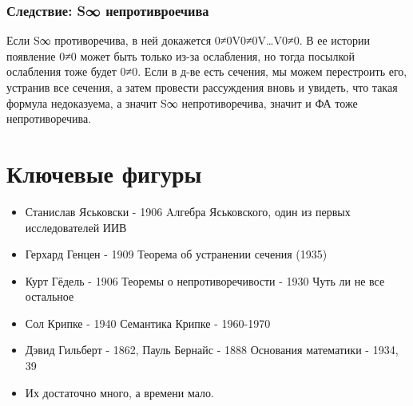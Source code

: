 \documentclass[11pt]{article}
\begin{document}
\subsubsection{Следствие: S∞ непротивроечива}
\label{sec-18-4-4}
Если S∞ противоречива, в ней докажется 0≠0V0≠0V\ldots{}V0≠0.
В ее истории появление 0≠0 может быть только из-за ослабления,
но тогда посылкой ослабления тоже будет 0≠0. Если в д-ве есть
сечения, мы можем перестроить его, устранив все сечения, а затем провести
рассуждения вновь и увидеть, что такая формула недоказуема, а значит
S∞ непротиворечива, значит и ФА тоже непротиворечива.
\section{Ключевые фигуры}
\label{sec-19}
\begin{itemize}
\item Станислав Яськовски - 1906
Aлгебра Яськовского, один из первых исследователей ИИВ
\item Герхард Генцен - 1909
Теорема об устранении сечения (1935)
\item Курт Гёдель - 1906
Теоремы о непротиворечивости - 1930
Чуть ли не все остальное
\item Сол Крипке - 1940
Семантика Крипке - 1960-1970
\item Дэвид Гильберт - 1862, Пауль Бернайс - 1888
Основания математики - 1934, 39
\item Их достаточно много, а времени мало.
\end{itemize}
\end{document}
